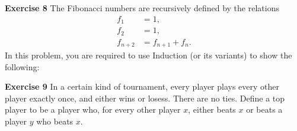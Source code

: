 \documentclass[12pt,oneside]{exam}
\newenvironment{exercise}[1]{\vspace{.1in}\noindent\textbf{Exercise #1 \hspace{.05em}}}{}
\begin{document}
\begin{exercise}{8}
The Fibonacci numbers are recursively defined by the relations
\begin{align*}
f_1 & =1,\\
f_2 & = 1,\\
f_{n+2} &=f_{n+1}+f_{n}.
\end{align*}
In this problem, you are required to use Induction (or its variants) to show the following:
\end{exercise}

\begin{exercise}{9}
In a certain kind of tournament, every player plays every other player exactly once, and either wins or losess. There are no ties. Define a top player to be a player who, for every other player $x$, either beats $x$ or beats a player $y$ who beats $x$. 
\end{exercise}
\end{document}

